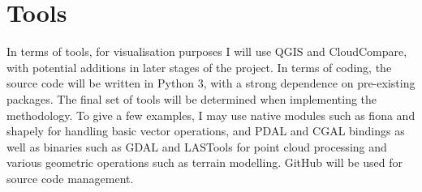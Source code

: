 \section*{Tools}

In terms of tools, for visualisation purposes I will use QGIS and CloudCompare, with potential additions in later stages of the project. In terms of coding, the source code will be written in Python 3, with a strong dependence on pre-existing packages. The final set of tools will be determined when implementing the methodology. To give a few examples, I may use native modules such as fiona and shapely for handling basic vector operations, and PDAL and CGAL bindings as well as binaries such as GDAL and LASTools for point cloud processing and various geometric operations such as terrain modelling. GitHub will be used for source code management.